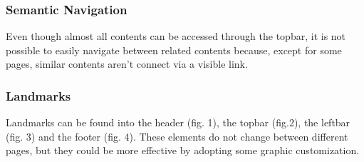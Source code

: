 \subsubsection{Semantic Navigation}
Even though almost all contents can be accessed through the topbar, it is not possible to easily navigate between related contents because, except for some pages, similar contents aren't connect via a visible link. 

\subsubsection{Landmarks}
Landmarks can be found into the header (fig. 1), the topbar (fig.2), the leftbar (fig. 3) and the footer (fig. 4). These elements do not change between different pages, but they could be more effective by adopting some graphic customization.